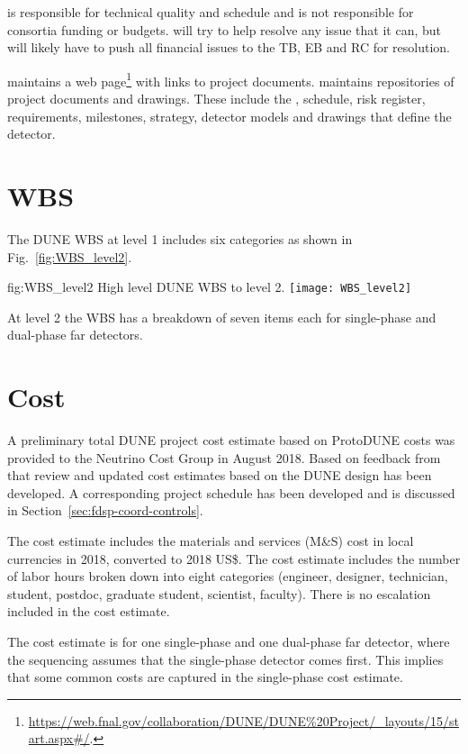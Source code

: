  is responsible for technical quality and schedule and is not
responsible for consortia funding or budgets.   will try to help
resolve any issue that it can, but will likely have to push all
financial issues to the TB, EB and RC for resolution.

 maintains a web
page\footnote{\url{https://web.fnal.gov/collaboration/DUNE/DUNE\%20Project/\_layouts/15/start.aspx\#/}.}
with links to project documents.  maintains repositories of
project documents and drawings. These include the ,
schedule, risk register, requirements, milestones, strategy, detector
models and drawings that define the  detector.

\section{WBS}
\label{sec:fdsp-coord-wbs}

The DUNE WBS at level 1 includes six categories as shown in
Fig.~\ref{fig:WBS_level2}.
\begin{dunefigure}{fig:WBS_level2}
  {High level DUNE WBS to level 2.}
  \texttt{[image: WBS\_level2]}
\end{dunefigure}
At level 2 the WBS has a breakdown of seven items
each for single-phase and dual-phase far detectors.

\section{Cost}
\label{sec:fdsp-coord-cost}

A preliminary total DUNE project cost estimate based on ProtoDUNE
costs was provided to the Neutrino Cost Group in August 2018. Based on
feedback from that review and updated cost estimates based on the DUNE
design has been developed. A corresponding project schedule has been
developed and is discussed in Section~\ref{sec:fdsp-coord-controls}.

The cost estimate includes the materials and services (M\&S) cost in
local currencies in 2018, converted to 2018 US\$. The cost estimate
includes the number of labor hours broken down into eight categories
(engineer, designer, technician, student, postdoc, graduate student,
scientist, faculty). There is no escalation included in the cost estimate.

The cost estimate is for one single-phase and one dual-phase far
detector, where the sequencing assumes that the single-phase detector
comes first. This implies that some common costs are captured in the
single-phase cost estimate.

